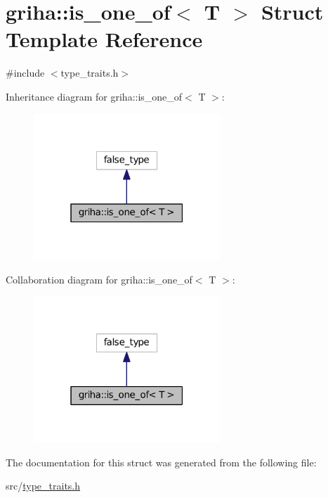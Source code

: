 \hypertarget{structgriha_1_1is__one__of_3_01_t_01_4}{}\section{griha\+:\+:is\+\_\+one\+\_\+of$<$ T $>$ Struct Template Reference}
\label{structgriha_1_1is__one__of_3_01_t_01_4}


{\ttfamily \#include $<$type\+\_\+traits.\+h$>$}



Inheritance diagram for griha\+:\+:is\+\_\+one\+\_\+of$<$ T $>$\+:
\nopagebreak
\begin{figure}[H]
\begin{center}
\leavevmode
\includegraphics[width=199pt]{structgriha_1_1is__one__of_3_01_t_01_4__inherit__graph}
\end{center}
\end{figure}


Collaboration diagram for griha\+:\+:is\+\_\+one\+\_\+of$<$ T $>$\+:
\nopagebreak
\begin{figure}[H]
\begin{center}
\leavevmode
\includegraphics[width=199pt]{structgriha_1_1is__one__of_3_01_t_01_4__coll__graph}
\end{center}
\end{figure}


The documentation for this struct was generated from the following file\+:\begin{DoxyCompactItemize}
\item 
src/\hyperlink{type__traits_8h}{type\+\_\+traits.\+h}\end{DoxyCompactItemize}
